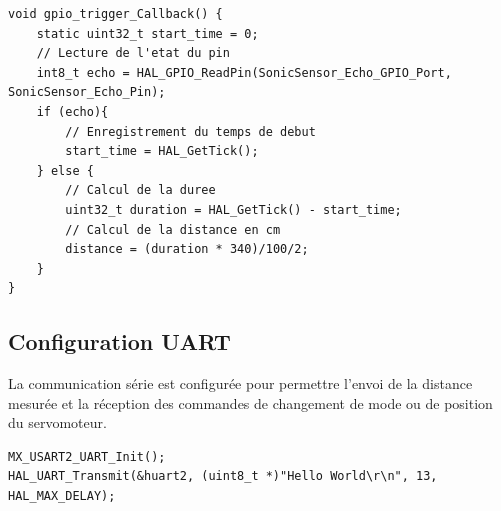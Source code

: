 \begin{lstlisting}[caption={Callback d'interruption EXTI}, label={lst:exticallback}]
void gpio_trigger_Callback() {
    static uint32_t start_time = 0;
    // Lecture de l'etat du pin
    int8_t echo = HAL_GPIO_ReadPin(SonicSensor_Echo_GPIO_Port, SonicSensor_Echo_Pin);
    if (echo){
        // Enregistrement du temps de debut
        start_time = HAL_GetTick();
    } else {
        // Calcul de la duree
        uint32_t duration = HAL_GetTick() - start_time;
        // Calcul de la distance en cm
        distance = (duration * 340)/100/2;
    }
}
\end{lstlisting}

\subsection{Configuration UART}
La communication série est configurée pour permettre l'envoi de la distance mesurée et la réception des commandes de changement de mode ou de position du servomoteur.

\begin{lstlisting}[caption={Initialisation UART}, label={lst:uartinit}]
MX_USART2_UART_Init();
HAL_UART_Transmit(&huart2, (uint8_t *)"Hello World\r\n", 13, HAL_MAX_DELAY);
\end{lstlisting}

